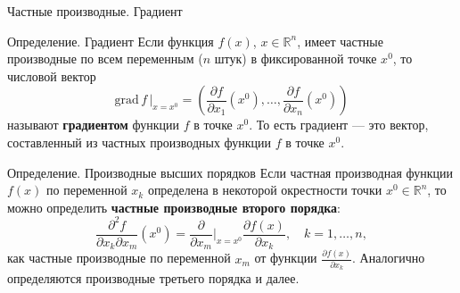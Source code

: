 \documentclass[8pt]{beamer}
\newcommand{\grad}{\mathrm{grad\,}}
\begin{document}

\begin{frame}{Частные производные. Градиент}
\begin{block}{Определение. Градиент}
Если функция $f(x)$, $x\in\mathbb{R}^n$, имеет частные производные по всем переменным ($n$ штук) в фиксированной точке $x^0$, то числовой вектор
$$\grad f\, \Big|_{x=x^0} = \left(\frac{\partial f}{\partial x_1}\left(x^0\right),\ldots, \frac{\partial f}{\partial x_n}\left(x^0\right)\right)$$
называют {\bf градиентом} функции $f$ в точке $x^0$. То есть градиент --- это вектор, составленный из частных производных функции $f$ в точке $x^0$. 
\end{block}

\begin{block}{Определение. Производные высших порядков}
Если частная производная функции $f(x)$ по переменной $x_k$ определена в некоторой окрестности точки $x^0\in\mathbb{R}^n$, то можно определить {\bf частные производные второго порядка}:
$$\frac{\partial^2 f}{\partial x_k\partial x_m}\left( x^0 \right) = \frac{\partial}{\partial x_m}\Big|_{x = x^0} \frac{\partial f(x)}{\partial x_k},\quad k=1,\ldots, n,$$
как частные производные по переменной $x_m$ от функции $\displaystyle \frac{\partial f(x)}{\partial x_k}$. Аналогично определяются производные третьего порядка и далее.
\end{block}
\end{frame}
\end{document}
